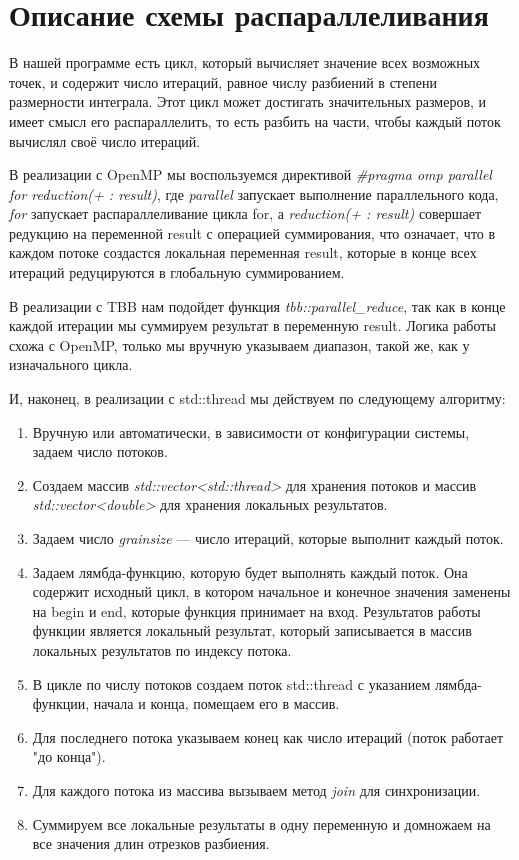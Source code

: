 \documentclass{report}
\begin{document}
\section*{Описание схемы распараллеливания}
\par В нашей программе есть цикл, который вычисляет значение всех возможных точек, и содержит число итераций, равное числу разбиений в степени размерности интеграла. Этот цикл может достигать значительных размеров, и имеет смысл его распараллелить, то есть разбить на части, чтобы каждый поток вычислял своё число итераций.
\par В реализации с OpenMP мы воспользуемся директивой \emph{\#pragma omp parallel for reduction(+ : result)}, где \emph{parallel} запускает выполнение параллельного кода, \emph{for} запускает распараллеливание цикла for, а \emph{reduction(+ : result)} совершает редукцию на переменной result с операцией суммирования, что означает, что в каждом потоке создастся локальная переменная result, которые в конце всех итераций редуцируются в глобальную суммированием.
\par В реализации с TBB нам подойдет функция \emph{tbb::parallel\_reduce}, так как в конце каждой итерации мы суммируем результат в переменную result. Логика работы схожа с OpenMP, только мы вручную указываем диапазон, такой же, как у изначального цикла.
\par И, наконец, в реализации с std::thread мы действуем по следующему алгоритму:
\begin{enumerate}
    \item Вручную или автоматически, в зависимости от конфигурации системы, задаем число потоков.
    \item Создаем массив \emph{std::vector<std::thread>} для хранения потоков и массив \emph{std::vector<double>} для хранения локальных результатов.
    \item Задаем число \emph{grainsize} --- число итераций, которые выполнит каждый поток.
    \item Задаем лямбда-функцию, которую будет выполнять каждый поток. Она содержит исходный цикл, в котором начальное и конечное значения заменены на begin и end, которые функция принимает на вход. Результатов работы функции является локальный результат, который записывается в массив локальных результатов по индексу потока.
    \item В цикле по числу потоков создаем поток std::thread с указанием лямбда-функции, начала и конца, помещаем его в массив.
    \item Для последнего потока указываем конец как число итераций (поток работает "до конца").
    \item Для каждого потока из массива вызываем метод \emph{join} для синхронизации.
    \item Суммируем все локальные результаты в одну переменную и домножаем на все значения длин отрезков разбиения.
\end{enumerate}
\newpage
\end{document}
